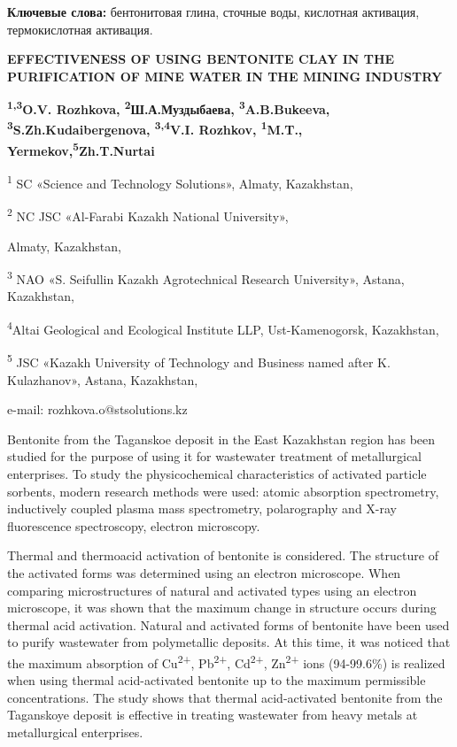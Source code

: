 {\bfseries Ключевые слова:} бентонитовая глина, сточные воды, кислотная
активация, термокислотная активация.

\begin{center}
{\large\bfseries EFFECTIVENESS OF USING BENTONITE CLAY IN THE PURIFICATION OF
MINE WATER IN THE MINING INDUSTRY}

{\bfseries \textsuperscript{1,3}O.V. Rozhkova, \textsuperscript{2}Ш.А.Муздыбаева, \textsuperscript{3}A.B.Bukeeva, \textsuperscript{3}S.Zh.Kudaibergenova, \textsuperscript{3,4}V.I. Rozhkov, \textsuperscript{1}M.T., Yermekov,\textsuperscript{5}Zh.T.Nurtai}

\textsuperscript{1} SC «Science and Technology Solutions», Almaty,
Kazakhstan,

\textsuperscript{2} NC JSC «Al-Farabi Kazakh National University»,

Almaty, Kazakhstan,

\textsuperscript{3} NAO «S. Seifullin Kazakh Agrotechnical Research
University», Astana, Kazakhstan,

\textsuperscript{4}Altai Geological and Ecological Institute LLP,
Ust-Kamenogorsk, Kazakhstan,

\textsuperscript{5} JSC «Kazakh University of Technology and Business
named after K. Kulazhanov», Astana, Kazakhstan,

e-mail: rozhkova.o@stsolutions.kz
\end{center}

Bentonite from the Taganskoe deposit in the East Kazakhstan region has
been studied for the purpose of using it for wastewater treatment of
metallurgical enterprises. To study the physicochemical characteristics
of activated particle sorbents, modern research methods were used:
atomic absorption spectrometry, inductively coupled plasma mass
spectrometry, polarography and X-ray fluorescence spectroscopy, electron
microscopy.

Thermal and thermoacid activation of bentonite is considered. The
structure of the activated forms was determined using an electron
microscope. When comparing microstructures of natural and activated
types using an electron microscope, it was shown that the maximum change
in structure occurs during thermal acid activation. Natural and
activated forms of bentonite have been used to purify wastewater from
polymetallic deposits. At this time, it was noticed that the maximum
absorption of Cu\textsuperscript{2+}, Pb\textsuperscript{2+},
Cd\textsuperscript{2+}, Zn\textsuperscript{2+} ions (94-99.6\%) is
realized when using thermal acid-activated bentonite up to the maximum
permissible concentrations. The study shows that thermal acid-activated
bentonite from the Taganskoye deposit is effective in treating
wastewater from heavy metals at metallurgical enterprises.

